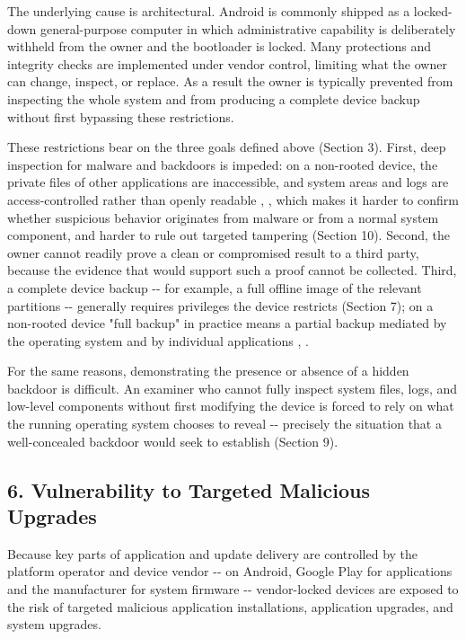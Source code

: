 \documentclass[
]{article}
\begin{document}
The underlying cause is architectural. Android is commonly shipped as a
locked-down general-purpose computer in which administrative capability
is deliberately withheld from the owner and the bootloader is locked.
Many protections and integrity checks are implemented under vendor
control, limiting what the owner can change, inspect, or replace. As a
result the owner is typically prevented from inspecting the whole system
and from producing a complete device backup without first bypassing
these restrictions.

These restrictions bear on the three goals defined above (Section 3).
First, deep inspection for malware and backdoors is impeded: on a
non-rooted device, the private files of other applications are
inaccessible, and system areas and logs are access-controlled rather
than openly readable \citep{mayrhofer-android-security-model},
\citep{aosp-selinux}, which makes it harder to confirm whether
suspicious behavior originates from malware or from a normal system
component, and harder to rule out targeted tampering (Section 10).
Second, the owner cannot readily prove a clean or compromised result to
a third party, because the evidence that would support such a proof
cannot be collected. Third, a complete device backup -\/- for example, a
full offline image of the relevant partitions -\/- generally requires
privileges the device restricts (Section 7); on a non-rooted device
"full backup" in practice means a partial backup mediated by the
operating system and by individual applications
\citep{android-allowbackup}, \citep{aosp-auto-backup}.

For the same reasons, demonstrating the presence or absence of a hidden
backdoor is difficult. An examiner who cannot fully inspect system
files, logs, and low-level components without first modifying the device
is forced to rely on what the running operating system chooses to reveal
-\/- precisely the situation that a well-concealed backdoor would seek
to establish (Section 9).

\subsection{6. Vulnerability to Targeted Malicious
Upgrades}\label{vulnerability-to-targeted-malicious-upgrades}

Because key parts of application and update delivery are controlled by
the platform operator and device vendor -\/- on Android, Google Play for
applications and the manufacturer for system firmware -\/- vendor-locked
devices are exposed to the risk of targeted malicious application
installations, application upgrades, and system upgrades.
\end{document}

